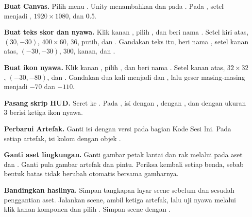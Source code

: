 \begin{langkah}
  \item \textbf{Buat Canvas.} Pilih menu
        . Unity menambahkan  dan
         pada . Pada ,
        setel  menjadi ,
         $1920 \times 1080$, dan  0.5.

  \item \textbf{Buat teks skor dan nyawa.} Klik kanan , pilih
        , dan beri nama . Setel
         kiri atas,  $(30,-30)$, 
        $400 \times 60$,  36,  putih, dan
         . Gandakan teks itu, beri nama
        , setel  kanan atas, 
        $(-30,-30)$,  300,  kanan, dan
         .

  \item \textbf{Buat ikon nyawa.} Klik kanan , pilih
        , dan beri nama . Setel
         kanan atas,  $32 \times 32$, 
        $(-30,-80)$, dan  . Gandakan dua kali
        menjadi  dan , lalu geser
         masing-masing menjadi $-70$ dan $-110$.

  \item \textbf{Pasang skrip HUD.} Seret  ke
        . Pada , isi  dengan
        ,  dengan , dan
         dengan ukuran 3 berisi ketiga ikon nyawa.

  \item \textbf{Perbarui Artefak.} Ganti isi 
        dengan versi pada bagian Kode Sesi Ini. Pada setiap artefak, isi
        kolom  dengan objek .

  \item \textbf{Ganti aset lingkungan.} Ganti gambar petak lantai dan rak
        melalui  pada aset  dan
        . Ganti pula gambar artefak dan pintu. Periksa kembali
         setiap benda, sebab bentuk batas tidak berubah
        otomatis bersama gambarnya.

  \item \textbf{Bandingkan hasilnya.} Simpan tangkapan layar scene sebelum
        dan sesudah penggantian aset. Jalankan scene, ambil ketiga artefak,
        lalu uji nyawa melalui klik kanan komponen  dan
        pilih . Simpan scene dengan
        .
\end{langkah}

